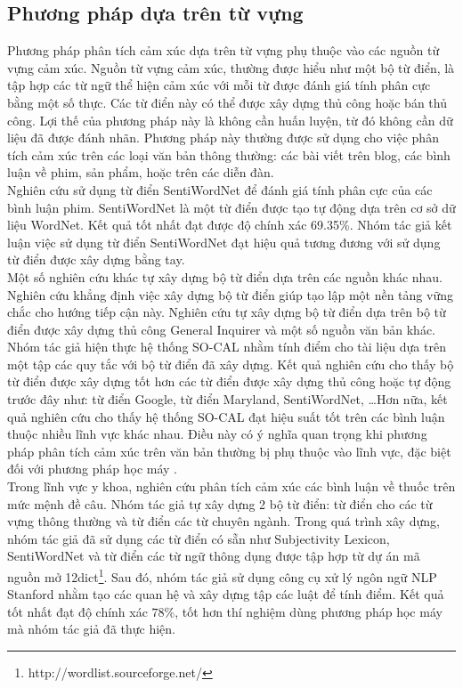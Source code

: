 \subsection{Phương pháp dựa trên từ vựng}
Phương pháp phân tích cảm xúc dựa trên từ vựng phụ thuộc vào các nguồn từ vựng cảm xúc. Nguồn từ vựng cảm xúc, thường được hiểu như một bộ từ điển, là tập hợp các từ ngữ thể hiện cảm xúc với mỗi từ được đánh giá tính phân cực bằng một số thực. Các từ điển này có thể được xây dựng thủ công hoặc bán thủ công. Lợi thế của phương pháp này là không cần huấn luyện, từ đó không cần dữ liệu đã được đánh nhãn. Phương pháp này thường được sử dụng cho việc phân tích cảm xúc trên các loại văn bản thông thường: các bài viết trên blog, các bình luận về phim, sản phẩm, hoặc trên các diễn đàn. \\

Nghiên cứu \cite{ohana2009sentiment} sử dụng từ điển SentiWordNet để đánh giá tính phân cực của các bình luận phim. SentiWordNet là một từ điển được tạo tự động dựa trên cơ sở dữ liệu WordNet. Kết quả tốt nhất đạt được độ chính xác 69.35\%. Nhóm tác giả kết luận việc sử dụng từ điển SentiWordNet đạt hiệu quả tương đương với sử dụng từ điển được xây dựng bằng tay.\\

Một số nghiên cứu khác tự xây dựng bộ từ điển dựa trên các nguồn khác nhau. Nghiên cứu \cite{taboada2011lexicon} khẳng định việc xây dựng bộ từ điển giúp tạo lập một nền tảng vững chắc cho hướng tiếp cận này. Nghiên cứu tự xây dựng bộ từ điển dựa trên bộ từ điển được xây dựng thủ công General Inquirer và một số nguồn văn bản khác. Nhóm tác giả hiện thực hệ thống SO-CAL nhằm tính điểm cho tài liệu dựa trên một tập các quy tắc với bộ từ điển đã xây dựng. Kết quả nghiên cứu cho thấy bộ từ điển được xây dựng tốt hơn các từ điển được xây dựng thủ công hoặc tự động trước đây như: từ điển Google, từ điển Maryland, SentiWordNet, \ldots Hơn nữa, kết quả nghiên cứu cho thấy hệ thống SO-CAL đạt hiệu suất tốt trên các bình luận thuộc nhiều lĩnh vực khác nhau. Điều này có ý nghĩa quan trọng khi phương pháp phân tích cảm xúc trên văn bản thường bị phụ thuộc vào lĩnh vực, đặc biệt đối với phương pháp học máy \cite{Giachanou2016}.\\

Trong lĩnh vực y khoa, nghiên cứu \cite{na2012sentiment} phân tích cảm xúc các bình luận về thuốc trên mức mệnh đề câu. Nhóm tác giả tự xây dựng 2 bộ từ điển: từ điển cho các từ vựng thông thường và từ điển các từ chuyên ngành. Trong quá trình xây dựng, nhóm tác giả đã sử dụng các từ điển có sẵn như Subjectivity Lexicon, SentiWordNet và từ điển các từ ngữ thông dụng được tập hợp từ dự án mã nguồn mở 12dict\footnote{http://wordlist.sourceforge.net/}. Sau đó, nhóm tác giả sử dụng công cụ xử lý ngôn ngữ NLP Stanford nhằm tạo các quan hệ và xây dựng tập các luật để tính điểm. Kết quả tốt nhất đạt độ chính xác $78\%$, tốt hơn thí nghiệm dùng phương pháp học máy mà nhóm tác giả đã thực hiện.
